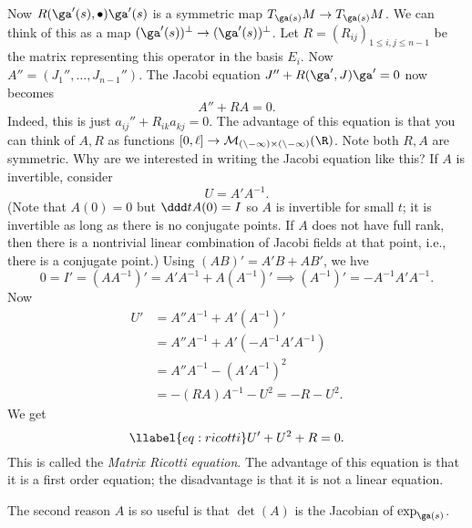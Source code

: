 Now $R(\ga'(s),\bullet)\ga'(s)$ is a symmetric map $T_{\ga(s)}M\to T_{\ga(s)}M$. We can think of this as a map $(\ga'(s))^{\perp}\to (\ga'(s))^{\perp}$. Let $R=(R_{ij})_{1\le i,j\le n-1}$ be the matrix representing this operator in the basis $E_i$. Now $A''=(J_1'',\ldots, J_{n-1}'')$. The Jacobi equation $J''+R(\ga',J)\ga'=0$ now becomes 
\begin{equation}
A''+RA=0.
\end{equation}
Indeed, this is just $a_{ij}''+R_{ik}a_{kj}=0$. The advantage of this equation is that you can think of $A,R$ as functions $[0,\ell]\to \cal M_{(n-1)\times(n-1)}(\R)$. Note both $R, A$ are symmetric.
Why are we interested in writing the Jacobi equation like this? If $A$ is invertible, consider 
\[U=A'A^{-1}.\]
(Note that $A(0)=0$ but $\ddd tA(0)=I$ so $A$ is invertible for small $t$; it is invertible as long as there is no conjugate points. If $A$ does not have full rank, then there is a nontrivial linear combination of Jacobi fields at that point, i.e., there is a conjugate point.)
Using $(AB)'=A'B+AB'$, we hve
\[
0=I'=(AA^{-1})'=A'A^{-1} + A(A^{-1})'\implies (A^{-1})'=-A^{-1}A'A^{-1}.
\]
Now 
\begin{align*}
U'&=A''A^{-1} + A'(A^{-1})'\\
&= A''A^{-1} + A'(-A^{-1}A'A^{-1})\\
&=A''A^{-1} - (A'A^{-1})^2\\
&=-(RA)A^{-1} -U^2=-R-U^2.
\end{align*}
We get 
\begin{equation}\llabel{eq:ricotti}
U'+U^2+R=0.
\end{equation}
This is called the {\it Matrix Ricotti equation}. %
The advantage of this equation is that it is a first order equation; the disadvantage is that it is not a linear equation.

The second reason $A$ is so useful is that $\det(A)$ is the Jacobian of $\exp_{\ga(s)}$.\\


\vskip0.15in

